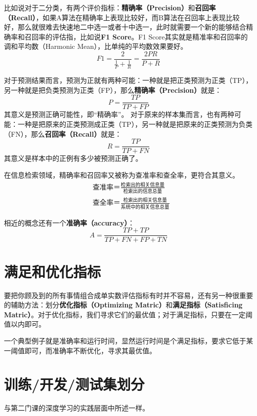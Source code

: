 \documentclass[../../main.tex]{subfiles}
\begin{document}
比如说对于二分类，有两个评价指标：\textbf{精确率（Precision）}和\textbf{召回率（Recall）}，如果A算法在精确率上表现比较好，而B算法在召回率上表现比较好，那么就很难去快速地二中选一或者十中选一，此时就需要一个新的能够结合精确率和召回率的评估指，比如说\textbf{F1 Score}。F1 Score其实就是精准率和召回率的调和平均数（Harmonic Mean），比单纯的平均数效果要好。\[
    F1 = \frac{2}{\frac{1}{P}+\frac{1}{R}} = \frac{2PR}{P+R}
\]

\begin{remark}[精确率和召回率]

    对于预测结果而言，预测为正就有两种可能：一种就是把正类预测为正类（TP），另一种就是把负类预测为正类（FP），那么\textbf{精确率（Precision）}就是：\[
        P = \frac{TP}{TP + FP}
    \]
    其意义是预测正确可能性，即“精确率”。
    对于原来的样本集而言，也有两种可能：一种是把原来的正类预测成正类（TP），另一种就是把原来的正类预测为负类（FN），那么\textbf{召回率（Recall）}就是：\[
        R = \frac{TP}{TP + FN}
    \]
    其意义是样本中的正例有多少被预测正确了。

    在信息检索领域，精确率和召回率又被称为查准率和查全率，更符合其意义。 \begin{align*}
         & 查准率＝\frac{检索出的相关信息量}{检索出的信息总量}     \\
         & 查全率＝\frac{检索出的相关信息量}{系统中的相关信息总量}
    \end{align*}

    相近的概念还有一个\textbf{准确率（accuracy）}：\[A = \frac{TP+TP}{TP + FN + FP + TN}\]
\end{remark}

\section{满足和优化指标}
要把你顾及到的所有事情组合成单实数评估指标有时并不容易，还有另一种很重要的辅助方法：划分\textbf{优化指标（Optimizing Matric）}和\textbf{满足指标（Satisficing Matric）}。对于优化指标，我们寻求它们的最优值；对于满足指标，只要在一定阈值以内即可。

一个典型例子就是准确率和运行时间，显然运行时间是个满足指标，要求它低于某一阈值即可，而准确率不断优化，寻求其最优值。

\section{训练/开发/测试集划分}
与第二门课的深度学习的实践层面中所述一样。
\end{document}

